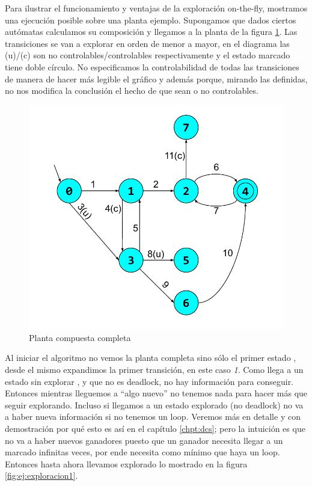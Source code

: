 Para ilustrar el funcionamiento y ventajas de la exploración on-the-fly, mostramos una ejecución posible sobre una planta ejemplo. Supongamos que dados ciertos autómatas calculamos su composición y llegamos a la planta de la figura \ref{fig:ej:plantaCompleta}. Las transiciones se van a explorar en orden de menor a mayor, en el diagrama las (u)/(c) son no controlables/controlables respectivamente y el estado marcado tiene doble círculo. No especificamos la controlabilidad de todas las transiciones de manera de hacer más legible el gráfico y además porque, mirando las definidas, no nos modifica la conclusión el hecho de que sean o no controlables. %

\begin{figure}
 \centering
 \includegraphics[scale=0.6]{figures/ejemplo_on-the-fly/0.pdf}
 \caption{Planta compuesta completa}
 \label{fig:ej:plantaCompleta}
\end{figure}

Al iniciar el algoritmo no vemos la planta completa sino sólo el primer estado , desde el mismo expandimos la primer transición, en este caso \textit{1}. Como llega a un estado sin explorar , y que no es deadlock, no hay información para conseguir. Entonces mientras lleguemos a ``algo nuevo'' no tenemos nada para hacer más que seguir explorando.
Incluso si llegamos a un estado explorado (no deadlock) no va a haber nueva información si no tenemos un loop. Veremos más en detalle y con demostración por qué esto es así en el capítulo \ref{chpt:dcs}; pero la intuición es que no va a haber nuevos ganadores puesto que un ganador necesita llegar a un marcado infinitas veces, por ende necesita como mínimo que haya un loop. Entonces hasta ahora llevamos explorado lo mostrado en la figura \ref{fig:ej:exploracion1}.

